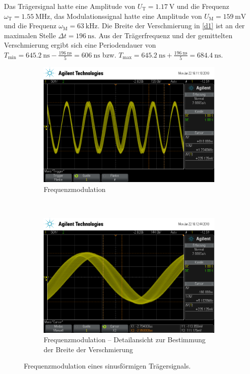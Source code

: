 Das Trägersignal hatte eine Amplitude von $U_\text{T}=\SI{1.17}{\volt}$ und die Frequenz $\omega_\text{T}=\SI{1.55}{\mega\hertz}$, das Modulationssignal hatte eine Amplitude von $U_\text{M}=\SI{159}{\milli\volt}$ und die Frequenz $\omega_\text{M}=\SI{63}{\kilo\hertz}$. Die Breite der Verschmierung in \autoref{d1} ist an der maximalen Stelle $\Delta t = \SI{196}{\nano\second}$. Aus der Trägerfrequenz und der gemittelten Verschmierung ergibt sich eine Periodendauer von $T_\text{min} = \SI{645.2}{\nano\second} - \frac{\SI{196}{\nano\second}}{5} = \SI{606}{\nano\second}$ bzw. $T_\text{max} = \SI{645.2}{\nano\second} + \frac{\SI{196}{\nano\second}}{5} = \SI{684.4}{\nano\second}$.

\begin{figure}[t!]
	\centering
	\begin{subfigure}[t]{0.5\textwidth}
		\centering
		\includegraphics[width=\textwidth]{img/d_scope_233.png}
		\caption{Frequenzmodulation}
	\end{subfigure}%
	~
	\begin{subfigure}[t]{0.5\textwidth}
		\centering
		\includegraphics[width=\textwidth]{img/d_scope_234.png}
		\caption{Frequenzmodulation -- Detailansicht zur Bestimmung der Breite der Verschmierung}
	\end{subfigure}
	\caption{Frequenzmodulation eines sinusförmigen Trägersignals.}
	\label{d1}
\end{figure}

